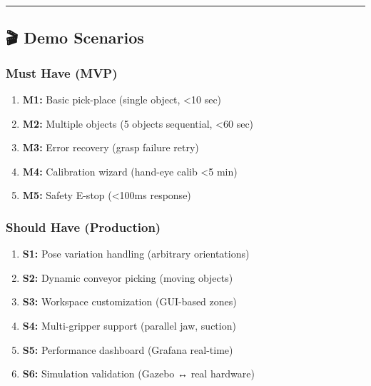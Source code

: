 \documentclass[
]{article}
\providecommand{\tightlist}{%
  \setlength{\itemsep}{0pt}\setlength{\parskip}{0pt}}
\begin{document}
\begin{center}\rule{0.5\linewidth}{0.5pt}\end{center}

\hypertarget{demo-scenarios}{%
\subsection{🎬 Demo Scenarios}\label{demo-scenarios}}

\hypertarget{must-have-mvp}{%
\subsubsection{Must Have (MVP)}\label{must-have-mvp}}

\begin{enumerate}
\def\labelenumi{\arabic{enumi}.}
\tightlist
\item
  \textbf{M1:} Basic pick-place (single object, \textless10 sec)
\item
  \textbf{M2:} Multiple objects (5 objects sequential, \textless60 sec)
\item
  \textbf{M3:} Error recovery (grasp failure retry)
\item
  \textbf{M4:} Calibration wizard (hand-eye calib \textless5 min)
\item
  \textbf{M5:} Safety E-stop (\textless100ms response)
\end{enumerate}

\hypertarget{should-have-production}{%
\subsubsection{Should Have (Production)}\label{should-have-production}}

\begin{enumerate}
\def\labelenumi{\arabic{enumi}.}
\setcounter{enumi}{5}
\tightlist
\item
  \textbf{S1:} Pose variation handling (arbitrary orientations)
\item
  \textbf{S2:} Dynamic conveyor picking (moving objects)
\item
  \textbf{S3:} Workspace customization (GUI-based zones)
\item
  \textbf{S4:} Multi-gripper support (parallel jaw, suction)
\item
  \textbf{S5:} Performance dashboard (Grafana real-time)
\item
  \textbf{S6:} Simulation validation (Gazebo ↔ real hardware)
\end{enumerate}
\end{document}
